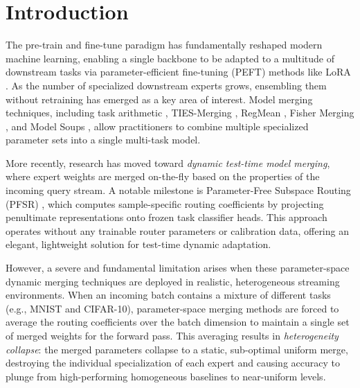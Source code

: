 \section{Introduction}
\label{sec:intro}

The pre-train and fine-tune paradigm has fundamentally reshaped modern machine learning, enabling a single backbone to be adapted to a multitude of downstream tasks via parameter-efficient fine-tuning (PEFT) methods like LoRA \cite{hu2021lora, peft2022, lialin2023peft}. As the number of specialized downstream experts grows, ensembling them without retraining has emerged as a key area of interest. Model merging techniques, including task arithmetic \cite{ilharco2022editing, ortiz2020task}, TIES-Merging \cite{yadav2023ties}, RegMean \cite{jin2022regmean}, Fisher Merging \cite{matena2021merging}, and Model Soups \cite{wortsman2022model}, allow practitioners to combine multiple specialized parameter sets into a single multi-task model.

More recently, research has moved toward \emph{dynamic test-time model merging}, where expert weights are merged on-the-fly based on the properties of the incoming query stream. A notable milestone is Parameter-Free Subspace Routing (PFSR) \cite{pfsr}, which computes sample-specific routing coefficients by projecting penultimate representations onto frozen task classifier heads. This approach operates without any trainable router parameters or calibration data, offering an elegant, lightweight solution for test-time dynamic adaptation.

However, a severe and fundamental limitation arises when these parameter-space dynamic merging techniques are deployed in realistic, heterogeneous streaming environments. When an incoming batch contains a mixture of different tasks (e.g., MNIST and CIFAR-10), parameter-space merging methods are forced to average the routing coefficients over the batch dimension to maintain a single set of merged weights for the forward pass. This averaging results in \emph{heterogeneity collapse}: the merged parameters collapse to a static, sub-optimal uniform merge, destroying the individual specialization of each expert and causing accuracy to plunge from high-performing homogeneous baselines to near-uniform levels.


